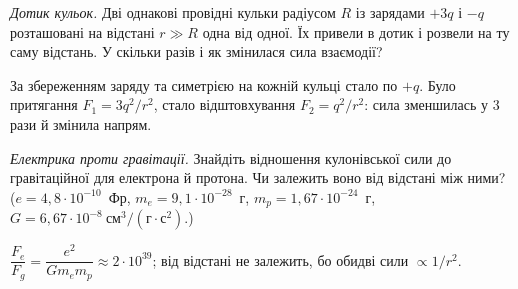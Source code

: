 \begin{problem}\label{prb:ChargeSharing}
	\emph{Дотик кульок.} 
	Дві однакові провідні кульки радіусом $R$ із зарядами $+3q$ і $-q$
	розташовані на відстані $r\gg R$ одна від одної. Їх привели в дотик і розвели на ту
	саму відстань. У скільки разів і як змінилася сила взаємодії?
	\begin{solution}
		За збереженням заряду та симетрією на кожній кульці стало по $+q$. Було притягання $F_1=3q^2/r^2$, стало відштовхування $F_2=q^2/r^2$: сила зменшилась у $3$ рази й змінила напрям.
	\end{solution}
\end{problem}

\begin{problem}\label{prb:CoulombVsGravity}
	\emph{Електрика проти гравітації.} 
	Знайдіть відношення кулонівської сили до
	гравітаційної для електрона й протона. Чи залежить воно від відстані між ними?
	($e=4{,}8\cdot10^{-10}$~Фр, $m_e=9{,}1\cdot10^{-28}$~г, $m_p=1{,}67\cdot10^{-24}$~г,
	$G=6{,}67\cdot10^{-8}\ \text{см}^3/(\text{г}\cdot\text{с}^2)$.)
	\begin{solution}
		$\dfrac{F_e}{F_g}=\dfrac{e^2}{Gm_em_p}\approx2\cdot10^{39}$; від відстані не залежить, бо обидві сили $\propto1/r^2$.
	\end{solution}
\end{problem}


